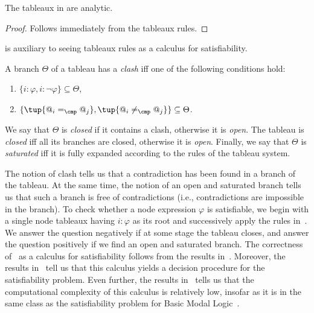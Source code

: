 \begin{lem} \label{prop:analytic}
    The tableaux in  are analytic.
\end{lem}
\begin{proof}
    Follows immediately from the tableaux rules.
\end{proof}

 is auxiliary to seeing tableaux rules as a calculus for satisfiability. 

\begin{defi} \label{def:clash}\label{def:saturated}\label{def:consistency}
    A branch $\Theta$ of a tableau has a \emph{clash} iff one of the following conditions hold:
        \begin{enumerate}
            \item $\{i{:}\varphi,  i{:}\neg \varphi\}\subseteq\Theta$,
            \item $\{\tup{@_i =_\cmp @_j},\tup{@_i \neq_\cmp @_j}\}\subseteq\Theta$.
    \end{enumerate}
    We say that $\Theta$ is \emph{closed} if it contains a clash, otherwise it is \emph{open}.
    The tableau is \emph{closed} iff all its branches are closed, otherwise it is \emph{open}. 
    Finally, we say that $\Theta$ is \emph{saturated} iff it is fully expanded according to the rules of the tableau system.
\end{defi}

The notion of clash tells us that a contradiction has been found in a branch of the tableau.
At the same time, the notion of an open and saturated branch tells us that such a branch is free of contradictions (i.e., contradictions are impossible in the branch).  
To check whether  a node expression $\varphi$ is satisfiable, 
we begin with a single node tableaux having $i{:}\varphi$ as its root and successively apply the rules in~.
We answer the question negatively if at some stage the tableau closes, and answer the question positively if we find an open and saturated branch. 
The correctness of~ as a calculus for satisfiability follows from the results in~.
Moreover, the results in~ tell us that this calculus yields a decision procedure for the satisfiability problem.
Even further, the results in~ tells us that the computational complexity of this calculus is relatively low, insofar as it is in the same class as the satisfiability problem for Basic Modal Logic~\cite{handbook06}.